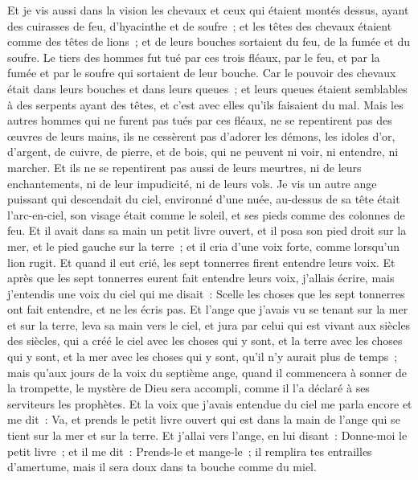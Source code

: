 \begin{multicols}{2}
Et je vis aussi dans la vision les chevaux et ceux qui étaient montés dessus, ayant des cuirasses de feu, d'hyacinthe et de soufre~; et les têtes des chevaux étaient comme des têtes de lions~; et de leurs bouches sortaient du feu, de la fumée et du soufre.
Le tiers des hommes fut tué par ces trois fléaux, par le feu, et par la fumée et par le soufre qui sortaient de leur bouche.
Car le pouvoir des chevaux était dans leurs bouches et dans leurs queues~; et leurs queues étaient semblables à des serpents ayant des têtes, et c'est avec elles qu'ils faisaient du mal.
Mais les autres hommes qui ne furent pas tués par ces fléaux, ne se repentirent pas des œuvres de leurs mains, ils ne cessèrent pas d'adorer les démons, les idoles d'or, d'argent, de cuivre, de pierre, et de bois, qui ne peuvent ni voir, ni entendre, ni marcher.
Et ils ne se repentirent pas aussi de leurs meurtres, ni de leurs enchantements, ni de leur impudicité, ni de leurs vols.
\VerseOne{}Je vis un autre ange puissant qui descendait du ciel, environné d'une nuée, au-dessus de sa tête était l'arc-en-ciel, son visage était comme le soleil, et ses pieds comme des colonnes de feu.
Et il avait dans sa main un petit livre ouvert, et il posa son pied droit sur la mer, et le pied gauche sur la terre~;
et il cria d'une voix forte, comme lorsqu'un lion rugit. Et quand il eut crié, les sept tonnerres firent entendre leurs voix.
Et après que les sept tonnerres eurent fait entendre leurs voix, j'allais écrire, mais j'entendis une voix du ciel qui me disait~: Scelle les choses que les sept tonnerres ont fait entendre, et ne les écris pas.
Et l'ange que j'avais vu se tenant sur la mer et sur la terre, leva sa main vers le ciel,
et jura par celui qui est vivant aux siècles des siècles, qui a créé le ciel avec les choses qui y sont, et la terre avec les choses qui y sont, et la mer avec les choses qui y sont, qu'il n'y aurait plus de temps~;
mais qu'aux jours de la voix du septième ange, quand il commencera à sonner de la trompette, le mystère de Dieu sera accompli, comme il l'a déclaré à ses serviteurs les prophètes.
Et la voix que j'avais entendue du ciel me parla encore et me dit~: Va, et prends le petit livre ouvert qui est dans la main de l'ange qui se tient sur la mer et sur la terre.
Et j'allai vers l'ange, en lui disant~: Donne-moi le petit livre~; et il me dit~: Prends-le et mange-le~; il remplira tes entrailles d'amertume, mais il sera doux dans ta bouche comme du miel.

\end{multicols}
